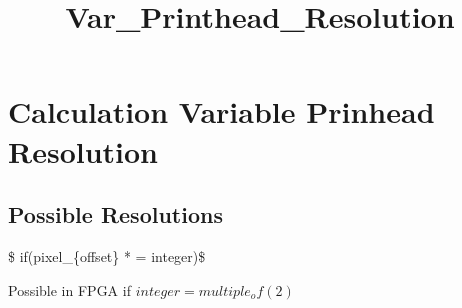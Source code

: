 \documentclass{article}
\title{Var\_Printhead\_Resolution}
\begin{document}
    
    
    \maketitle
    
    

    
    \section{Calculation Variable Prinhead
Resolution}\label{calculation-variable-prinhead-resolution}

    \subsection{Possible Resolutions}\label{possible-resolutions}

    \$ if(pixel\_\{offset\} *  = integer)\$

Possible in FPGA if \(integer = multiple_of(2)\)
\end{document}
